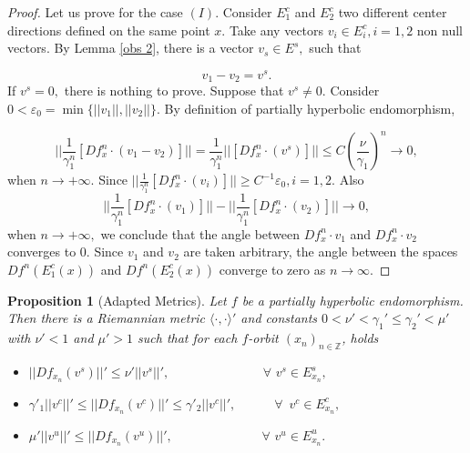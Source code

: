 \documentclass[12pt,reqno]{amsart}
\numberwithin{equation}{section}
\theoremstyle{plain}
\newcommand{\Z}{\mathbb{Z}}
\newtheorem{proposition}[theorem]{Proposition}
\theoremstyle{remark}
\begin{document}
\begin{proof}
Let us prove for the case $(I).$ Consider $E^c_1$ and $E^c_2$ two different center directions defined on the same point $x.$ Take any vectors $v_i  \in E^c_i, i =1,2$ non null vectors. By Lemma \ref{obs 2}, there is a vector $v_s \in E^s,$ such that

$$v_1 - v_2 = v^s.$$
If $v^s = 0,$ there is nothing to prove. Suppose that $v^s \neq 0.$ Consider \mbox{$0 <\varepsilon_0  =  \min \{||v_1||, ||v_2||\}.$}  By definition of partially hyperbolic endomorphism,

$$|| \frac{1}{\gamma_1^n}  [Df^n_x \cdot (v_1 - v_2)]|| =  \frac{1}{\gamma_1^n}  ||[Df^n_x \cdot (v^s)]|| \leq C (\frac{\nu}{\gamma_1})^n \rightarrow 0, $$
when $n \rightarrow +\infty.$ Since $|| \frac{1}{\gamma_1^n}  [Df^n_x \cdot (v_i)]|| \geq C^{-1}\varepsilon_0, i = 1,2.$ Also $$|| \frac{1}{\gamma_1^n}  [Df^n_x \cdot (v_1)]|| - || \frac{1}{\gamma_1^n}  [Df^n_x \cdot (v_2)]|| \rightarrow 0,$$ when  $n \rightarrow +\infty,$ we conclude that the angle between $ Df^n_x \cdot v_1$ and  $ Df^n_x \cdot v_2$ converges to $0.$ Since $v_1$ and $v_2$ are taken arbitrary, the angle between the spaces $Df^n(E^c_1(x))$ and $Df^n(E^c_2(x))$ converge to zero as $n\rightarrow\infty.$









\end{proof}





\begin{proposition}[Adapted Metrics]\label{apt_metric} Let $f$ be a partially hyperbolic endomorphism. Then there is a Riemannian metric
$\langle\cdot,\cdot\rangle'$ and constants  $0<\nu'<\gamma_1'\leq\gamma_2'<\mu'$ with $\nu'<1$ and $\mu'>1$ such that for each $f$-orbit $(x_n)_{n\in{\Z}}$, holds

\begin{itemize}
 \item[(1)] $||Df_{x_n}(v^s)||'\leq \nu'||v^s||',\,\,\,\,\,\,\,\,\,\,\,\,\,\,\,\,\,\,\,\,\,\,\,\,\,\,\,\,\,\,\,\,\,\,\,\,\,\,\,\,\,\,\,\,\forall\,\, v^s\in E_{x_n}^s,$
 \item[(2)] $\gamma'_1||v^c||'\leq||Df_{x_n}(v^c)||'\leq \gamma'_2||v^c||',\,\,\,\,\,\,\,\,\,\,\,\,\,\,\,\,\,\,\forall\,\,\, v^c\in E_{x_n}^c,$
 \item[(3)] $\mu'||v^u||'\leq||Df_{x_n}(v^u)||',\,\,\,\,\,\,\,\,\,\,\,\,\,\,\,\,\,\,\,\,\,\,\,\,\,\,\,\,\,\,\,\,\,\,\,\,\,\,\,\,\,\,\forall\,\, v^u\in E_{x_n}^u.$
\end{itemize}
\end{proposition}
\end{document}
